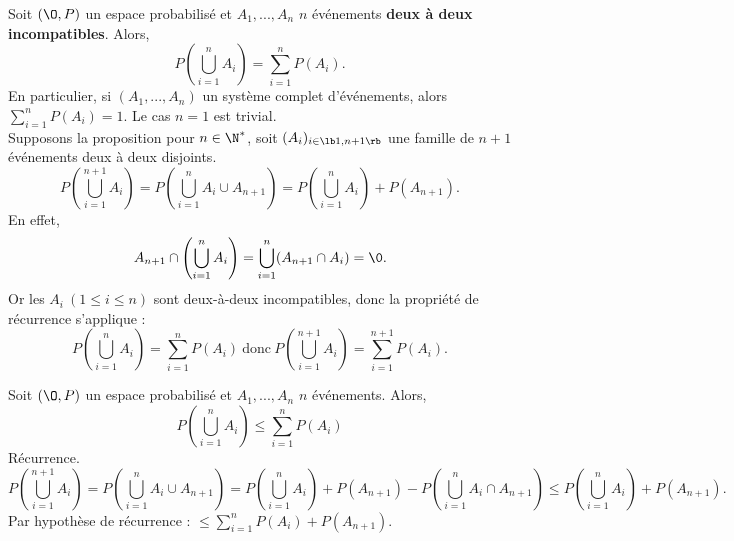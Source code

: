 \documentclass[11pt]{article}
\begin{document}
\begin{prop}{}{}
    Soit $(\O,P)$ un espace probabilisé et $A_1,...,A_n$ $n$ événements \textbf{deux à deux incompatibles}. Alors,
    \begin{equation*}
        P\left( \bigcup_{i=1}^nA_i \right)=\sum_{i=1}^nP(A_i).
    \end{equation*}
    En particulier, si $(A_1,...,A_n)$ un système complet d'événements, alors $\sum\limits_{i=1}^nP(A_i)=1$.
    \tcblower
    Le cas $n=1$ est trivial.\\
    Supposons la proposition pour $n\in\N^*$, soit $(A_i)_{i\in\lb1,n+1\rb}$ une famille de $n+1$ événements deux à deux disjoints.
    \begin{equation*}
        P\left( \bigcup_{i=1}^{n+1}A_i \right) = P\left( \bigcup_{i=1}^nA_i\cup A_{n+1} \right) = P\left( \bigcup_{i=1}^nA_i \right) + P(A_{n+1}).
    \end{equation*}
    En effet, 
    \begin{equation*}
        A_{n+1}\cap\left(\bigcup_{i=1}^nA_i\right) = \bigcup_{i=1}^n(A_{n+1}\cap A_i) = \0.
    \end{equation*}
    Or les $A_i~(1\leq i \leq n)$ sont deux-à-deux incompatibles, donc la propriété de récurrence s'applique :
    \begin{equation*}
        P\left( \bigcup_{i=1}^nA_i \right)=\sum_{i=1}^nP(A_i) ~ \text{donc} ~ P\left( \bigcup_{i=1}^{n+1}A_i \right) = \sum_{i=1}^{n+1}P(A_i).
    \end{equation*}
\end{prop}

\begin{prop}{}{}
    Soit $(\O,P)$ un espace probabilisé et $A_1,...,A_n$ $n$ événements. Alors,
    \begin{equation*}
        P\left( \bigcup_{i=1}^nA_i \right) \leq \sum_{i=1}^nP(A_i)
    \end{equation*}
    \tcblower
    Récurrence.
    \begin{equation*}
        P\left( \bigcup_{i=1}^{n+1} A_i \right) = P\left( \bigcup_{i=1}^nA_i \cup A_{n+1} \right)=P\left( \bigcup_{i=1}^nA_i \right) + P(A_{n+1}) - P(\bigcup_{i=1}^nA_i\cap A_{n+1})\leq P\left( \bigcup_{i=1}^nA_i \right) + P(A_{n+1}).
    \end{equation*}
    Par hypothèse de récurrence : $\leq \sum_{i=1}^nP(A_i)+P(A_{n+1})$.
\end{prop}
\end{document}
